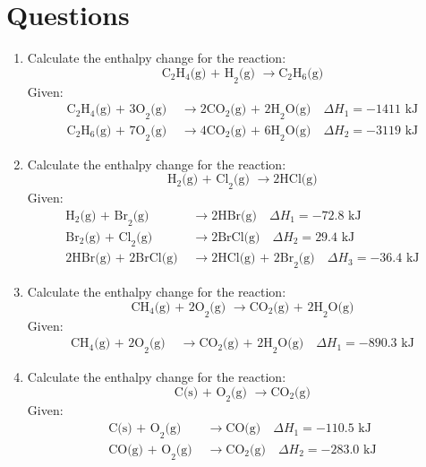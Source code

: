 \documentclass{article}
\begin{document}
\section*{Questions}
\begin{enumerate}
    \item Calculate the enthalpy change for the reaction:
    \[
    \text{C}_2\text{H}_4\text{(g) + H}_2\text{(g) } \rightarrow \text{C}_2\text{H}_6\text{(g)}
    \]
    Given:
    \begin{align*}
    \text{C}_2\text{H}_4\text{(g) + 3O}_2\text{(g) } &\rightarrow \text{2CO}_2\text{(g) + 2H}_2\text{O(g)} \quad \Delta H_1 = -1411 \text{ kJ} \\
    \text{C}_2\text{H}_6\text{(g) + 7O}_2\text{(g) } &\rightarrow \text{4CO}_2\text{(g) + 6H}_2\text{O(g)} \quad \Delta H_2 = -3119 \text{ kJ}
    \end{align*}

    \item Calculate the enthalpy change for the reaction:
    \[
    \text{H}_2\text{(g) + Cl}_2\text{(g) } \rightarrow \text{2HCl(g)}
    \]
    Given:
    \begin{align*}
    \text{H}_2\text{(g) + Br}_2\text{(g) } &\rightarrow \text{2HBr(g)} \quad \Delta H_1 = -72.8 \text{ kJ} \\
    \text{Br}_2\text{(g) + Cl}_2\text{(g) } &\rightarrow \text{2BrCl(g)} \quad \Delta H_2 = 29.4 \text{ kJ} \\
    \text{2HBr(g) + 2BrCl(g) } &\rightarrow \text{2HCl(g) + 2Br}_2\text{(g)} \quad \Delta H_3 = -36.4 \text{ kJ}
    \end{align*}

    \item Calculate the enthalpy change for the reaction:
    \[
    \text{CH}_4\text{(g) + 2O}_2\text{(g) } \rightarrow \text{CO}_2\text{(g) + 2H}_2\text{O(g)}
    \]
    Given:
    \begin{align*}
    \text{CH}_4\text{(g) + 2O}_2\text{(g) } &\rightarrow \text{CO}_2\text{(g) + 2H}_2\text{O(g)} \quad \Delta H_1 = -890.3 \text{ kJ}
    \end{align*}

    \item Calculate the enthalpy change for the reaction:
    \[
    \text{C(s) + O}_2\text{(g) } \rightarrow \text{CO}_2\text{(g)}
    \]
    Given:
    \begin{align*}
    \text{C(s) + O}_2\text{(g) } &\rightarrow \text{CO(g)} \quad \Delta H_1 = -110.5 \text{ kJ} \\
    \text{CO(g) + O}_2\text{(g) } &\rightarrow \text{CO}_2\text{(g)} \quad \Delta H_2 = -283.0 \text{ kJ}
    \end{align*}
\end{enumerate}

\newpage
\
\end{document}
